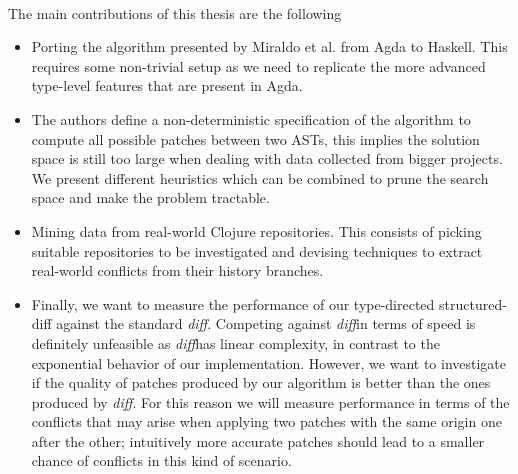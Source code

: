 \documentclass[11pt, titlepage]{article}
\newcommand{\diff}{\emph{diff}}
\begin{document}
\\
The main contributions of this thesis are the following 
\begin{itemize}
\item Porting the algorithm presented by Miraldo et al. from Agda to Haskell. This requires some non-trivial setup as we need to replicate the more advanced type-level features that are present in Agda.
\item The authors define a non-deterministic specification of the algorithm to compute all possible patches between two ASTs, this implies the solution space is still too large when dealing with data collected from bigger projects. We present different heuristics which can be combined to prune the search space and make the problem tractable.
\item Mining data from real-world Clojure repositories. This consists of picking suitable repositories to be investigated and devising techniques to extract real-world conflicts from their history branches.
\item Finally, we want to measure the performance of our type-directed structured-diff against the standard \diff. Competing against \diff in terms of speed is definitely unfeasible as \diff has linear complexity, in contrast to the exponential behavior of our implementation. However, we want to investigate if the quality of patches produced by our algorithm is better than the ones produced by \diff. For this reason we will measure performance in terms of the conflicts that may arise when applying two patches with the same origin one after the other; intuitively more accurate patches should lead to a smaller chance of conflicts in this kind of scenario. 
\end{itemize}
\end{document}
